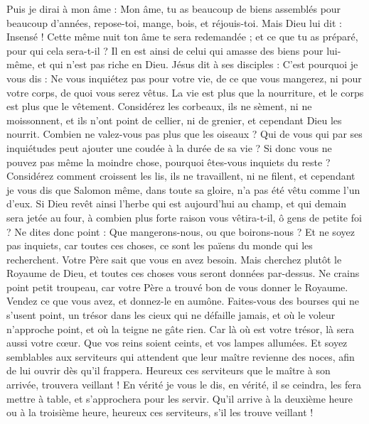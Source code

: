 \begin{multicols}{2}
Puis je dirai à mon âme : Mon âme, tu as beaucoup de biens assemblés pour beaucoup d'années, repose-toi, mange, bois, et réjouis-toi.
Mais Dieu lui dit : Insensé ! Cette même nuit ton âme te sera redemandée ; et ce que tu as préparé, pour qui cela sera-t-il ?
Il en est ainsi de celui qui amasse des biens pour lui-même, et qui n'est pas riche en Dieu.
Jésus dit à ses disciples : C'est pourquoi je vous dis : Ne vous inquiétez pas pour votre vie, de ce que vous mangerez, ni pour votre corps, de quoi vous serez vêtus.
La vie est plus que la nourriture, et le corps est plus que le vêtement.
Considérez les corbeaux, ils ne sèment, ni ne moissonnent, et ils n'ont point de cellier, ni de grenier, et cependant Dieu les nourrit. Combien ne valez-vous pas plus que les oiseaux ?
Qui de vous qui par ses inquiétudes peut ajouter une coudée à la durée de sa vie ?
Si donc vous ne pouvez pas même la moindre chose, pourquoi êtes-vous inquiets du reste ?
Considérez comment croissent les lis, ils ne travaillent, ni ne filent, et cependant je vous dis que Salomon même, dans toute sa gloire, n'a pas été vêtu comme l'un d'eux.
Si Dieu revêt ainsi l'herbe qui est aujourd'hui au champ, et qui demain sera jetée au four, à combien plus forte raison vous vêtira-t-il, ô gens de petite foi ?
Ne dites donc point : Que mangerons-nous, ou que boirons-nous ? Et ne soyez pas inquiets,
car toutes ces choses, ce sont les païens du monde qui les recherchent. Votre Père sait que vous en avez besoin.
Mais cherchez plutôt le Royaume de Dieu, et toutes ces choses vous seront données par-dessus.
Ne crains point petit troupeau, car votre Père a trouvé bon de vous donner le Royaume.
Vendez ce que vous avez, et donnez-le en aumône. Faites-vous des bourses qui ne s'usent point, un trésor dans les cieux qui ne défaille jamais, et où le voleur n'approche point, et où la teigne ne gâte rien.
Car là où est votre trésor, là sera aussi votre cœur.
Que vos reins soient ceints, et vos lampes allumées.
Et soyez semblables aux serviteurs qui attendent que leur maître revienne des noces, afin de lui ouvrir dès qu'il frappera.
Heureux ces serviteurs que le maître à son arrivée, trouvera veillant ! En vérité je vous le dis, en vérité, il se ceindra, les fera mettre à table, et s'approchera pour les servir.
Qu'il arrive à la deuxième heure ou à la troisième heure, heureux ces serviteurs, s'il les trouve veillant !

\end{multicols}
